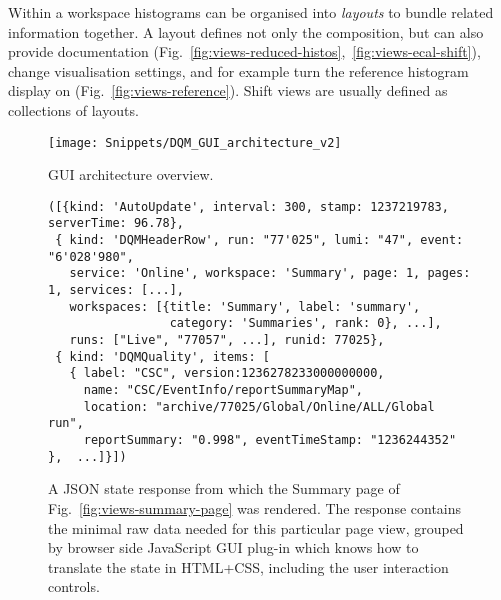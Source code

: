 \documentclass[a4paper]{jpconf}
\begin{document}
Within a workspace histograms can be organised into {\em layouts} to
bundle related information together.  A layout defines not only the
composition, but can also provide documentation
(Fig.~\ref{fig:views-reduced-histos},~\ref{fig:views-ecal-shift}),
change visualisation settings, and for example turn the reference
histogram display on (Fig.~\ref{fig:views-reference}).  Shift views
are usually defined as collections of layouts.

\begin{figure}[!tbp]
\begin{center}
\texttt{[image: Snippets/DQM\_GUI\_architecture\_v2]}
\caption{\label{fig:arch}GUI architecture overview.}
\end{center}
\end{figure}

\begin{figure}[!tbp]
\begin{center}
\vspace{1em}
\begin{verbatim}
([{kind: 'AutoUpdate', interval: 300, stamp: 1237219783, serverTime: 96.78},
 { kind: 'DQMHeaderRow', run: "77'025", lumi: "47", event: "6'028'980",
   service: 'Online', workspace: 'Summary', page: 1, pages: 1, services: [...],
   workspaces: [{title: 'Summary', label: 'summary',
                 category: 'Summaries', rank: 0}, ...],
   runs: ["Live", "77057", ...], runid: 77025},
 { kind: 'DQMQuality', items: [
   { label: "CSC", version:1236278233000000000,
     name: "CSC/EventInfo/reportSummaryMap",
     location: "archive/77025/Global/Online/ALL/Global run",
     reportSummary: "0.998", eventTimeStamp: "1236244352" },  ...]}])
\end{verbatim}
\caption{\label{fig:json}A JSON state response from which the Summary
  page of Fig.~\ref{fig:views-summary-page} was rendered.  The
  response contains the minimal raw data needed for this particular
  page view, grouped by browser side JavaScript GUI plug-in which
  knows how to translate the state in HTML+CSS, including the user
  interaction controls.}
\end{center}
\end{figure}
\end{document}
